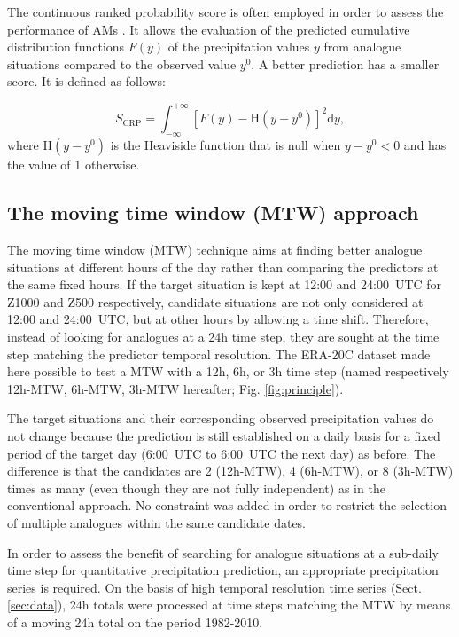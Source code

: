 \documentclass[hess, manuscript]{copernicus}
\begin{document}
	The continuous ranked probability score \citep[CRPS,][]{Brown1974, Matheson1976, Hersbach2000} is often employed in order to assess the performance of AMs \citep[see, e.g.,][]{Bontron2004, Bontron2005, BenDaoud2008, Horton2012, Marty2012, Radanovics2013, Chardon2014, Junk2015, BenDaoud2016, Caillouet2016}. It allows the evaluation of the predicted cumulative distribution functions $F(y)$ of the precipitation values $y$ from analogue situations compared to the observed value $y^{0}$. A better prediction has a smaller score. It is defined as follows:
	
	\begin{equation}
	\label{eq:CRPS}
	S_{\text{CRP}} = \int_{-\infty}^{+\infty} \left[ F(y)-\text{H}(y-y^{0})\right]^{2} \text{d}y ,  
	\end{equation}
	where $\text{H}(y-y^{0})$ is the Heaviside function that is null when $y-y^{0}<0$ and has the value of 1 otherwise.
	
	
	\subsection{The moving time window (MTW) approach}
	\label{sec:mtw}
	
	The moving time window (MTW) technique aims at finding better analogue situations at different hours of the day rather than comparing the predictors at the same fixed hours. If the target situation is kept at 12:00 and 24:00~UTC for Z1000 and Z500 respectively, candidate situations are not only considered at 12:00 and 24:00~UTC, but at other hours by allowing a time shift. Therefore, instead of looking for analogues at a 24h time step, they are sought at the time step matching the predictor temporal resolution. The ERA-20C dataset made here possible to test a MTW with a 12h, 6h, or 3h time step (named respectively 12h-MTW, 6h-MTW, 3h-MTW hereafter; Fig. \ref{fig:principle}).
	
	The target situations and their corresponding observed precipitation values do not change because the prediction is still established on a daily basis for a fixed period of the target day (6:00~UTC to 6:00~UTC the next day) as before. The difference is that the candidates are 2 (12h-MTW), 4 (6h-MTW), or 8 (3h-MTW) times as many (even though they are not fully independent) as in the conventional approach. No constraint was added in order to restrict the selection of multiple analogues within the same candidate dates.
	
	In order to assess the benefit of searching for analogue situations at a sub-daily time step for quantitative precipitation prediction, an appropriate precipitation series is required. On the basis of high temporal resolution time series (Sect. \ref{sec:data}), 24h totals were processed at time steps matching the MTW by means of a moving 24h total on the period 1982-2010. 
	
\end{document}
